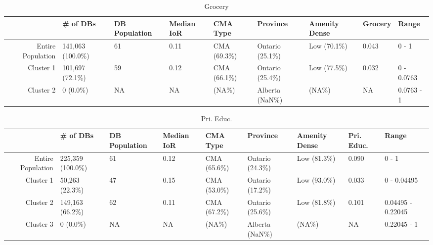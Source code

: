 \documentclass[10pt, a4paper]{article}
\begin{document}
\begin{sidewaystable}[ht]
\centering
\begin{tabular}{rllllllll}
  \hline
 & \# of DBs & DB Population & Median IoR & CMA Type & Province & Amenity Dense & Grocery & Range \\ 
  \hline
Entire Population & 141,063 (100.0\%) & 61 & 0.11 & CMA (69.3\%) & Ontario (25.1\%) & Low (70.1\%) & 0.043 & 0 - 1 \\ 
  Cluster 1 & 101,697 (72.1\%) & 59 & 0.12 & CMA (66.1\%) & Ontario (25.4\%) & Low (77.5\%) & 0.032 & 0 - 0.0763 \\ 
  Cluster 2 & 0 (0.0\%) & NA & NA &  (NA\%) & Alberta (NaN\%) &  (NA\%) & NA & 0.0763 - 1 \\ 
   \hline
\end{tabular}
\caption{Grocery} 
\end{sidewaystable}





 \pagebreak 
 
\begin{sidewaystable}[ht]
\centering
\begin{tabular}{rllllllll}
  \hline
 & \# of DBs & DB Population & Median IoR & CMA Type & Province & Amenity Dense & Pri. Educ. & Range \\ 
  \hline
Entire Population & 225,359 (100.0\%) & 61 & 0.12 & CMA (65.6\%) & Ontario (24.3\%) & Low (81.3\%) & 0.090 & 0 - 1 \\ 
  Cluster 1 & 50,263 (22.3\%) & 47 & 0.15 & CMA (53.0\%) & Ontario (17.2\%) & Low (93.0\%) & 0.033 & 0 - 0.04495 \\ 
  Cluster 2 & 149,163 (66.2\%) & 62 & 0.11 & CMA (67.2\%) & Ontario (25.6\%) & Low (81.8\%) & 0.101 & 0.04495 - 0.22045 \\ 
  Cluster 3 & 0 (0.0\%) & NA & NA &  (NA\%) & Alberta (NaN\%) &  (NA\%) & NA & 0.22045 - 1 \\ 
   \hline
\end{tabular}
\caption{Pri. Educ.} 
\end{sidewaystable}





 \pagebreak 
 
\end{document}
